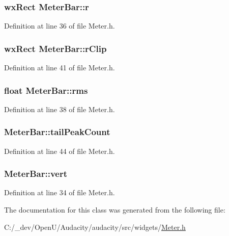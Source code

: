 \subsubsection[{\texorpdfstring{r}{r}}]{\setlength{\rightskip}{0pt plus 5cm}wx\+Rect Meter\+Bar\+::r}\hypertarget{struct_meter_bar_ae0020ac33b767c882cad1d6e0e1d3f1a}{}\label{struct_meter_bar_ae0020ac33b767c882cad1d6e0e1d3f1a}


Definition at line 36 of file Meter.\+h.

\subsubsection[{\texorpdfstring{r\+Clip}{rClip}}]{\setlength{\rightskip}{0pt plus 5cm}wx\+Rect Meter\+Bar\+::r\+Clip}\hypertarget{struct_meter_bar_a1228c67130a0299e865782a7759d8a08}{}\label{struct_meter_bar_a1228c67130a0299e865782a7759d8a08}


Definition at line 41 of file Meter.\+h.

\subsubsection[{\texorpdfstring{rms}{rms}}]{\setlength{\rightskip}{0pt plus 5cm}float Meter\+Bar\+::rms}\hypertarget{struct_meter_bar_a68fedd727318bcce9d423fc527c7fd45}{}\label{struct_meter_bar_a68fedd727318bcce9d423fc527c7fd45}


Definition at line 38 of file Meter.\+h.

\subsubsection[{\texorpdfstring{tail\+Peak\+Count}{tailPeakCount}}]{ Meter\+Bar\+::tail\+Peak\+Count}\hypertarget{struct_meter_bar_a64cc0b3fd7fce6ae589ea4ce5721f1b0}{}\label{struct_meter_bar_a64cc0b3fd7fce6ae589ea4ce5721f1b0}


Definition at line 44 of file Meter.\+h.

\subsubsection[{\texorpdfstring{vert}{vert}}]{ Meter\+Bar\+::vert}\hypertarget{struct_meter_bar_a842a6130e175626ac4bcf3e1df60e7b0}{}\label{struct_meter_bar_a842a6130e175626ac4bcf3e1df60e7b0}


Definition at line 34 of file Meter.\+h.



The documentation for this class was generated from the following file\+:\begin{DoxyCompactItemize}
\item 
C\+:/\+\_\+dev/\+Open\+U/\+Audacity/audacity/src/widgets/\hyperlink{_meter_8h}{Meter.\+h}\end{DoxyCompactItemize}
